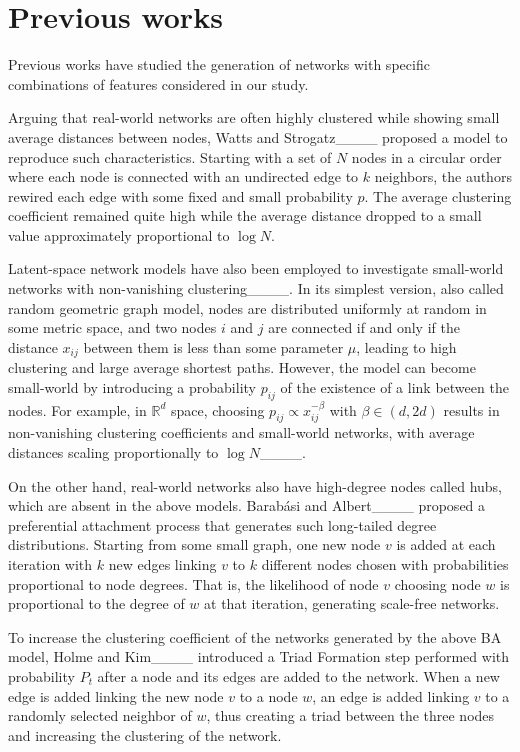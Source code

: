 \section{Previous works}
Previous works have studied the generation of networks with specific combinations of features considered in our study. 

Arguing that real-world networks are often highly clustered while showing small average distances between nodes, Watts and Strogatz____ proposed a model to reproduce such characteristics. Starting with a set of $N$ nodes in a circular order where each node is connected with an undirected edge to $k$ neighbors, the authors rewired each edge with some fixed and small probability $p$. The average clustering coefficient remained quite high while the average distance dropped to a small value approximately proportional to $\log N$. 

Latent-space network models have also been employed to investigate small-world networks with non-vanishing clustering____. 
In its simplest version, also called random geometric graph model, nodes are distributed uniformly at random in some metric space, and two nodes $i$ and $j$ are connected if and only if the distance $x_{i j}$ between them is less than some parameter $\mu$, leading to high clustering and large average shortest paths. 
However, the model can become small-world by introducing a probability $p_{i j}$ of the existence of a link between the nodes. 
For example, in $\mathbb{R}^d$ space, choosing $p_{i j} \propto x_{i j}^{-\beta}$ with $\beta \in (d, 2d)$ results in non-vanishing clustering coefficients and small-world networks, with average distances scaling proportionally to $\log N$____. 

On the other hand, real-world networks also have high-degree nodes called hubs, which are absent in the above models. 
Barabási and Albert____ proposed a preferential attachment process that generates such long-tailed degree distributions. 
Starting from some small graph, one new node $v$ is added at each iteration with $k$ new edges linking $v$ to $k$ different nodes chosen with probabilities proportional to node degrees. That is, the likelihood of node $v$ choosing node $w$ is proportional to the degree of $w$ at that iteration, generating scale-free networks.

To increase the clustering coefficient of the networks generated by the above BA model, Holme and Kim____ introduced a Triad Formation step performed with probability $P_t$ after a node and its edges are added to the network. When a new edge is added linking the new node $v$ to a node $w$, an edge is added linking $v$ to a randomly selected neighbor of $w$, thus creating a triad between the three nodes and increasing the clustering of the network. 

